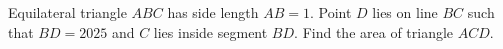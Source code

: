 Equilateral triangle $ABC$ has side length $AB=1$. Point $D$ lies on line $BC$ such that $BD=2025$ and $C$ lies inside segment $BD$. Find the area of triangle $ACD$.
